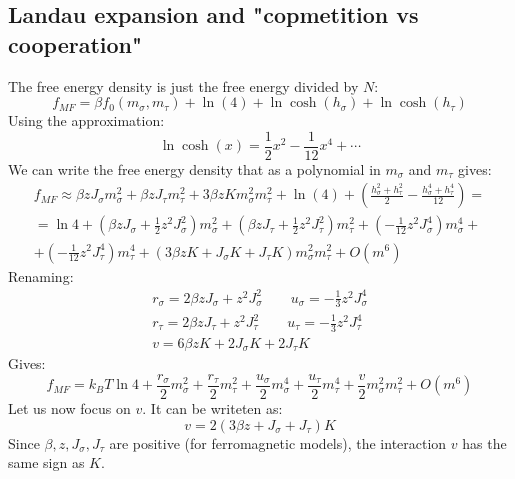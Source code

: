 \documentclass{article}
\begin{document}
\subsection{Landau expansion and "copmetition vs cooperation"}
The free energy density is just the free energy divided by $N$:
\begin{equation}
    f_{MF} = \beta f_0(m_\sigma, m_\tau) + \ln(4) + \ln\cosh(h_\sigma) + \ln\cosh(h_\tau)
\end{equation}
Using the approximation:
\begin{equation}
    \ln\cosh(x) = \frac{1}{2}x^2 - \frac{1}{12}x^4 + \cdots
\end{equation}
We can write the free energy density that as a polynomial in $m_\sigma$ and $m_\tau$ gives:
\begin{equation}
\begin{gathered}
    f_{MF} \approx \beta zJ_\sigma m_\sigma^2 + \beta zJ_\tau m_\tau^2 + 3\beta zKm_\sigma^2 m_\tau^2 + \ln(4) + \left(\frac{h_\sigma^2 + h_\tau^2}{2} - \frac{h_\sigma^4 + h_\tau^4}{12}\right) = \\ =
    \ln4 +
    \left(\beta zJ_\sigma + \frac{1}{2}z^2J_\sigma^2\right)m_\sigma^2 +
    \left(\beta zJ_\tau + \frac{1}{2} z^2J_\tau^2\right)m_\tau^2 +
    \left(-\frac{1}{12}z^2J_\sigma^4\right)m_\sigma^4 + \\ +
    \left(-\frac{1}{12}z^2J_\tau^4\right)m_\tau^4 +
    \left(3\beta zK + J_\sigma K + J_\tau K\right)m_\sigma^2m_\tau^2 +
    O(m^6)
\end{gathered}
\end{equation}
Renaming:
\begin{equation}
\begin{gathered}
    r_\sigma = 2\beta zJ_\sigma + z^2J_\sigma^2
    \qquad
    u_\sigma = -\frac{1}{3}z^2J_\sigma^4
    \\
    r_\tau = 2\beta zJ_\tau + z^2J_\tau^2
    \qquad
    u_\tau = -\frac{1}{3}z^2J_\tau^4
    \\
    v = 6\beta zK + 2J_\sigma K + 2J_\tau K
\end{gathered}
\end{equation}
Gives:
\begin{equation}
    f_{MF} = k_BT\ln4 + \frac{r_\sigma}{2}m_\sigma^2 + \frac{r_\tau}{2}m_\tau^2 + \frac{u_\sigma}{2}m_\sigma^4 + \frac{u_\tau}{2}m_\tau^4 + \frac{v}{2}m_\sigma^2m_\tau^2 + O(m^6)
\end{equation}
Let us now focus on $v$. It can be writeten as:
\begin{equation}
    v = 2(3\beta z + J_\sigma + J_\tau) K
\end{equation}
Since $\beta, z, J_\sigma, J_\tau$ are positive (for ferromagnetic models), the interaction $v$ has the same sign as $K$.
\end{document}
